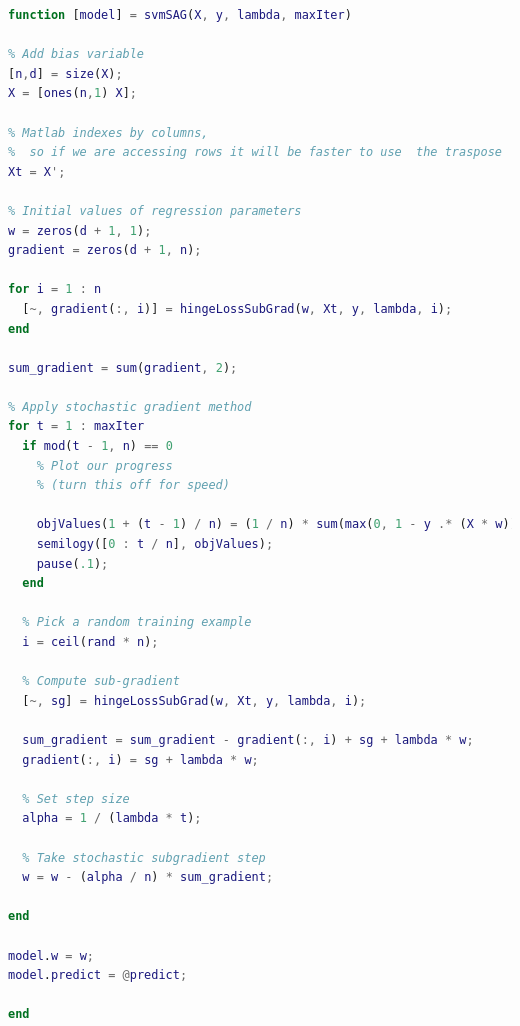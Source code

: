 \documentclass[10pt]{article}
\begin{document}
\begin{lstlisting}[language=MATLAB]
function [model] = svmSAG(X, y, lambda, maxIter)

% Add bias variable
[n,d] = size(X);
X = [ones(n,1) X];

% Matlab indexes by columns,
%  so if we are accessing rows it will be faster to use  the traspose
Xt = X';

% Initial values of regression parameters
w = zeros(d + 1, 1);
gradient = zeros(d + 1, n);

for i = 1 : n
  [~, gradient(:, i)] = hingeLossSubGrad(w, Xt, y, lambda, i);
end

sum_gradient = sum(gradient, 2);

% Apply stochastic gradient method
for t = 1 : maxIter
  if mod(t - 1, n) == 0
    % Plot our progress
    % (turn this off for speed)
        
    objValues(1 + (t - 1) / n) = (1 / n) * sum(max(0, 1 - y .* (X * w))) + (lambda / 2) * (w' * w);
    semilogy([0 : t / n], objValues);
    pause(.1);
  end
    
  % Pick a random training example
  i = ceil(rand * n);

  % Compute sub-gradient
  [~, sg] = hingeLossSubGrad(w, Xt, y, lambda, i);

  sum_gradient = sum_gradient - gradient(:, i) + sg + lambda * w;
  gradient(:, i) = sg + lambda * w;

  % Set step size
  alpha = 1 / (lambda * t);
    
  % Take stochastic subgradient step
  w = w - (alpha / n) * sum_gradient;

end

model.w = w;
model.predict = @predict;

end
\end{lstlisting}
\end{document}
